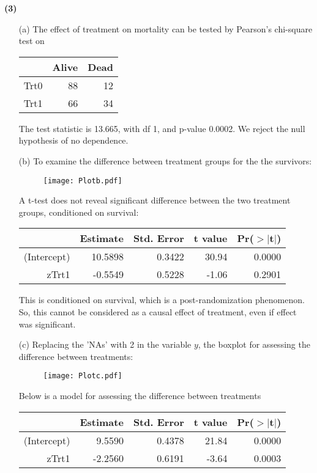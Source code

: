 \documentclass[11pt,a4paper]{article}
\begin{document}
\noindent
\textbf{(3)} 
\begin{enumerate}
\item[(a)] The effect of treatment on mortality can be tested by Pearson's chi-square test on
\begin{table}[H]
\centering
\begin{tabular}{rrr}
  \hline
 & Alive & Dead \\ 
  \hline
Trt0 &  88 &  12 \\ 
  Trt1 &  66 &  34 \\ 
   \hline
\end{tabular}
\end{table}
The test statistic is 13.665, with df 1, and p-value 0.0002. We reject the null hypothesis of no dependence. 

\item[(b)] To examine the difference between treatment groups for the the survivors:
\begin{figure}[H]
\begin{center}
\texttt{[image: Plotb.pdf]}
\end{center}
\end{figure}
A t-test does not reveal significant difference between the two treatment groups, conditioned on survival:
\begin{table}[H]
\centering
\begin{tabular}{rrrrr}
  \hline
 & Estimate & Std. Error & t value & Pr($>$$|$t$|$) \\ 
  \hline
(Intercept) & 10.5898 & 0.3422 & 30.94 & 0.0000 \\ 
  zTrt1 & -0.5549 & 0.5228 & -1.06 & 0.2901 \\ 
   \hline
\end{tabular}
\end{table}
This is conditioned on survival, which is a post-randomization phenomenon. So, this cannot be considered as a causal effect of treatment, even if effect was significant.
\item[(c)]
Replacing the 'NAs' with 2 in the variable $y$, the boxplot for assessing the difference between treatments:
\begin{figure}[H]
\begin{center}
\texttt{[image: Plotc.pdf]}
\end{center}
\end{figure}
Below is a model for assessing the difference between treatments
\begin{table}[H]
\centering
\begin{tabular}{rrrrr}
  \hline
 & Estimate & Std. Error & t value & Pr($>$$|$t$|$) \\ 
  \hline
(Intercept) & 9.5590 & 0.4378 & 21.84 & 0.0000 \\ 
  zTrt1 & -2.2560 & 0.6191 & -3.64 & 0.0003 \\ 
   \hline
\end{tabular}
\end{table}


\end{enumerate}
\end{document}
